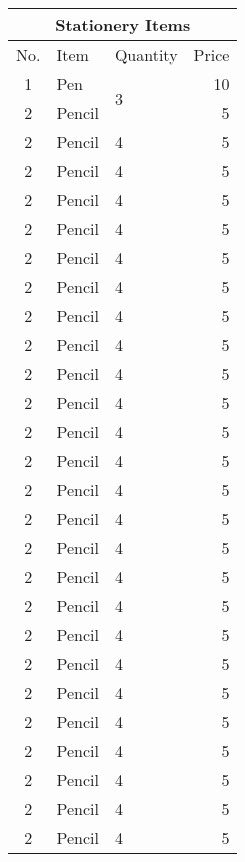 \documentclass{article}
\begin{document}
    \renewcommand{\arraystretch}{1.5}
    \begin{tabular}{|c|l|l|r|}
        \hline
        \multicolumn{4}{|c|}{Stationery Items} \\
        \hline
        No. & Item & Quantity & Price\\
        \hline
        1 & Pen & \multirow{2}{*}{3} & 10\\
        \cline{1-2}\cline{4-4}
        2 & Pencil & 4 & 5\\
        \hline
        2 & Pencil & 4 & 5\\
        \hline
        2 & Pencil & 4 & 5\\
        \hline
        2 & Pencil & 4 & 5\\
        \hline
        2 & Pencil & 4 & 5\\
        \hline
        2 & Pencil & 4 & 5\\
        \hline
        2 & Pencil & 4 & 5\\
        \hline
        2 & Pencil & 4 & 5\\
        \hline
        2 & Pencil & 4 & 5\\
        \hline
        2 & Pencil & 4 & 5\\
        \hline
        2 & Pencil & 4 & 5\\
        \hline
        2 & Pencil & 4 & 5\\
        \hline
        2 & Pencil & 4 & 5\\
        \hline
        2 & Pencil & 4 & 5\\
        \hline
        2 & Pencil & 4 & 5\\
        \hline
        2 & Pencil & 4 & 5\\
        \hline
        2 & Pencil & 4 & 5\\
        \hline
        2 & Pencil & 4 & 5\\
        \hline
        2 & Pencil & 4 & 5\\
        \hline
        2 & Pencil & 4 & 5\\
        \hline
        2 & Pencil & 4 & 5\\
        \hline
        2 & Pencil & 4 & 5\\
        \hline
        2 & Pencil & 4 & 5\\
        \hline
        2 & Pencil & 4 & 5\\
        \hline
        2 & Pencil & 4 & 5\\
        \hline
        2 & Pencil & 4 & 5\\

\end{tabular}
\end{document}
